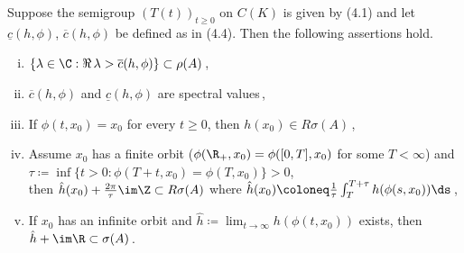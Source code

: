 \begin{proposition}\label{prop:b3-4.8}
	Suppose the semigroup $(T(t))_{t\geq 0}$ on $C(K)$ is given by (4.1) and let $\underline{c}(h,\phi)$, $\overline{c}(h,\phi)$ be defined as in (4.4).
	Then the following assertions hold.
	\begin{enumerate}[(i)]
		\item 
		$\{\lambda \in \C : \Re\,\lambda  > \overline{c}(h,\phi)\} \subset \rho(A)$\,,
		
		\item 
		$\overline{c}(h,\phi)$ and $\underline{c}(h,\phi)$ are spectral values\,,
		
		\item 
		If $\phi(t,x_{0}) = x_{0}$ for every $t \geq 0$, then $h(x_{0}) \in R{\sigma}(A)$\,,
		
		\item 
		Assume $x_{0}$ has a finite orbit (\ie $\phi(\R_{+},x_{0}) = \phi([0,T],x_{0})$ for some $T < \infty$) and $\tau \coloneq \inf\{t > 0 : \phi(T+t,x_{0}) = \phi(T,x_{0})\} > 0$, \\
		then $\hat{h}(x_{0}) + \frac{2\pi}{\tau}\im\Z \subset R{\sigma}(A)$ where $\hat{h}(x_{0}) \coloneq	\frac{1}{\tau}\int_{T}^{T+\tau}h(\phi(s,x_{0}))\ds $\,,
		
		\item 
		If $x_{0}$ has an infinite orbit and $\hat{h} \coloneq  \lim_{t\to\infty}h(\phi(t,x_{0}))$ exists, then $\hat{h} + \im\R \subset \sigma(A)$\,.
	\end{enumerate}
\end{proposition}
